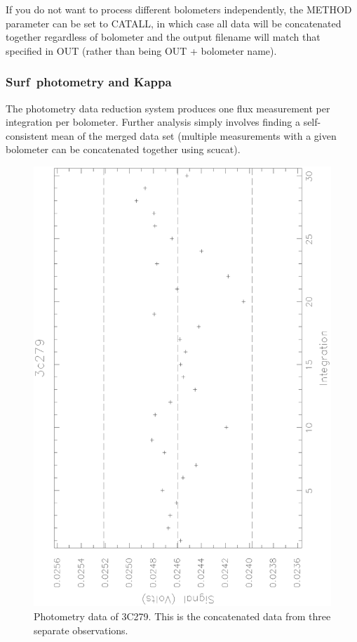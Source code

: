 \documentclass[twoside,11pt]{article}
\newcommand{\scusoft}          {{\sc Surf}}
\newcommand{\task}[1]{{\sf #1}}
\newcommand{\scucat}{\htmlref{\task{scucat}}{SCUCAT}}
\newcommand{\htmlref}[2]{#1}
\newcommand{\xref}[3]{#1}
\renewcommand{\_}{\texttt{\symbol{95}}}
\begin{document}
If you do not want to process different bolometers independently, the
METHOD parameter can be set to CATALL, in which case all data will
be concatenated together regardless of bolometer and the output filename
will match that specified in OUT (rather than being OUT + bolometer name).


\subsubsection{\scusoft\ photometry and \xref{{\sc Kappa}}{sun95}{}}

The photometry data reduction system produces one flux measurement per
integration per bolometer. Further analysis simply involves finding a
self-consistent mean of the merged data set (multiple measurements with a
given bolometer can be concatenated together using \scucat).

\begin{figure}
\begin{center}
\includegraphics[angle=270,width=5in]{sun216_qdraw.eps}
\caption{Photometry data of 3C279. This is the concatenated data from three
separate observations.}
\label{qdrawfig}
\end{center}
\end{figure}
\end{document}
